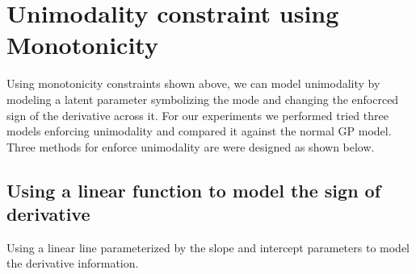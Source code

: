 \section{Unimodality constraint using Monotonicity}
Using monotonicity constraints shown above, we can model unimodality by modeling a latent parameter symbolizing the mode and changing the enfocrced sign of the derivative across it. For our experiments we performed tried three models enforcing unimodality and compared it against the normal GP model. Three methods for enforce unimodality are were designed as shown below.

\subsection{Using a linear function to model the sign of derivative}
Using a linear line parameterized by the slope and intercept parameters to model the derivative information.